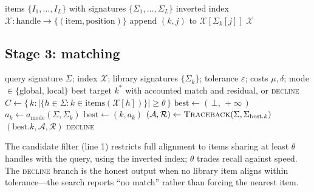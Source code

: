 \documentclass[11pt,twocolumn,a4paper]{article}
\theoremstyle{thmstyle}
\theoremstyle{definition}
\theoremstyle{remark}
\newcommand{\hand}{h}
\newcommand{\sig}{\Sigma}
\newcommand{\algn}{a}
\newcommand{\abs}[1]{\lvert#1\rvert}
\newcommand{\eps}{\varepsilon}
\begin{document}
\begin{algorithm}[!htbp]
\caption{\textsc{Index}: library of items $\to$ searchable index}
\label{alg:index}
\begin{algorithmic}[1]
\Require items $\{I_1,\dots,I_L\}$ with signatures $\{\sig_1,\dots,\sig_L\}$
\Ensure inverted index $\mathcal{X}\colon \text{handle}\to\{(\text{item},
  \text{position})\}$
  \For{$j \gets 1$ \textbf{to} $\abs{\sig_k}$}
    \State append $(k,j)$ to $\mathcal{X}[\sig_k[j]]$
  \EndFor
\EndFor
\State \Return $\mathcal{X}$
\end{algorithmic}
\end{algorithm}

\subsection{Stage 3: matching}

\begin{algorithm}[!htbp]
\caption{\textsc{Match}: query signature $\to$ (accounted match, residual)}
\label{alg:match}
\begin{algorithmic}[1]
\Require query signature $\sig$; index $\mathcal{X}$; library signatures
  $\{\sig_k\}$; tolerance $\eps$; costs $\mu,\delta$; mode $\in\{$global,
  local$\}$
\Ensure best target $k^{\ast}$ with accounted match and residual, or
  \textsc{decline}
\State $C \gets \{\, k : \abs{\{\hand\in\sig : k \in
  \text{items}(\mathcal{X}[\hand])\}} \ge \theta \,\}$
\State $\text{best} \gets (\,\bot,\,+\infty\,)$
  \State $a_k \gets \algn_{\text{mode}}(\sig,\sig_k)$
    \State $\text{best} \gets (k, a_k)$
  \EndIf
\EndFor
\If{$\text{best}.\text{score} \le \eps$}
  \State $(\mathcal{A},\mathcal{R}) \gets
    \textsc{Traceback}(\sig,\sig_{\text{best}.k})$
  \State \Return $(\text{best}.k, \mathcal{A}, \mathcal{R})$
\Else
  \State \Return \textsc{decline}
\EndIf
\end{algorithmic}
\end{algorithm}

The candidate filter (line 1) restricts full alignment to items sharing at least
$\theta$ handles with the query, using the inverted index; $\theta$ trades recall
against speed. The \textsc{decline} branch is the honest output when no library
item aligns within tolerance---the search reports ``no match'' rather than
forcing the nearest item.
\end{document}
